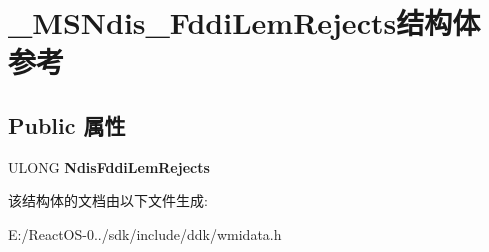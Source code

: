 \hypertarget{struct___m_s_ndis___fddi_lem_rejects}{}\section{\+\_\+\+M\+S\+Ndis\+\_\+\+Fddi\+Lem\+Rejects结构体 参考}
\label{struct___m_s_ndis___fddi_lem_rejects}
\subsection*{Public 属性}
\begin{DoxyCompactItemize}
\item 
\mbox{\label{struct___m_s_ndis___fddi_lem_rejects_ad36c55c43e0bee5a6e9727d5fdfb916f}} 
U\+L\+O\+NG {\bfseries Ndis\+Fddi\+Lem\+Rejects}
\end{DoxyCompactItemize}


该结构体的文档由以下文件生成\+:\begin{DoxyCompactItemize}
\item 
E\+:/\+React\+O\+S-\/0../sdk/include/ddk/wmidata.\+h\end{DoxyCompactItemize}
